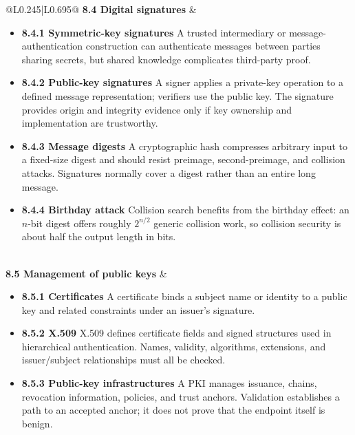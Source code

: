 \documentclass[10pt,letterpaper]{article}
\begin{document}
\begin{longtable}{@{}L{0.245\textwidth}|L{0.695\textwidth}@{}}
\textbf{8.4 Digital signatures} & \begin{minipage}[t]{\linewidth}\raggedright \begin{itemize}\item \textbf{8.4.1 Symmetric-key signatures} A trusted intermediary or message-authentication construction can authenticate messages between parties sharing secrets, but shared knowledge complicates third-party proof.\item \textbf{8.4.2 Public-key signatures} A signer applies a private-key operation to a defined message representation; verifiers use the public key. The signature provides origin and integrity evidence only if key ownership and implementation are trustworthy.\item \textbf{8.4.3 Message digests} A cryptographic hash compresses arbitrary input to a fixed-size digest and should resist preimage, second-preimage, and collision attacks. Signatures normally cover a digest rather than an entire long message.\item \textbf{8.4.4 Birthday attack} Collision search benefits from the birthday effect: an $n$-bit digest offers roughly $2^{n/2}$ generic collision work, so collision security is about half the output length in bits.\end{itemize}\end{minipage} \\ \hline
{}\textbf{8.5 Management of public keys} & \begin{minipage}[t]{\linewidth}\raggedright \begin{itemize}\item \textbf{8.5.1 Certificates} A certificate binds a subject name or identity to a public key and related constraints under an issuer's signature.\item \textbf{8.5.2 X.509} X.509 defines certificate fields and signed structures used in hierarchical authentication. Names, validity, algorithms, extensions, and issuer/subject relationships must all be checked.\item \textbf{8.5.3 Public-key infrastructures} A PKI manages issuance, chains, revocation information, policies, and trust anchors. Validation establishes a path to an accepted anchor; it does not prove that the endpoint itself is benign.\end{itemize}\end{minipage} \\ \hline

\end{longtable}
\end{document}

